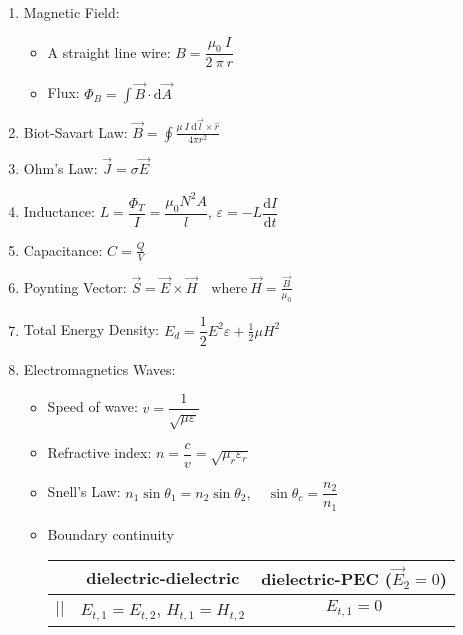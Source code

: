 \documentclass[a4paper, 11pt]{article}
\begin{document}
\begin{enumerate}
    \item Magnetic Field:
    \begin{itemize}
        \item A straight line wire: $B = \dfrac{\mu_{0} \ I}{2 \ \pi \ r}$
        \item Flux: $\Phi_{B} = \int\vec{B} \cdot \mathrm{d}\vec{A}$
    \end{itemize}

    \item Biot-Savart Law: $\displaystyle \vec{B} = \oint\frac{\mu \ I \ \mathrm{d}\vec{l}\times \hat{r}}{4 \pi r^{2}}$

    \item Ohm's Law: $\vec{J} = \sigma \vec{E}$

    \item Inductance: $L = \dfrac{\Phi_{T}}{I} = \dfrac{\mu_{0}N^{2}A}{l}$, \quad \quad $\varepsilon = -L\dfrac{\mathrm{d}I}{\mathrm{d}t}$

    \item Capacitance: $\displaystyle C = \frac{Q}{V}$

    \item Poynting Vector: $\displaystyle \vec{S} = \vec{E}\times \vec{H}\quad \text{where} \ \vec{H}=\frac{\vec{B}}{\mu_{0}}$

    \item Total Energy Density: $E_{d}=\dfrac{1}{2}E^{2}\varepsilon+\frac{1}{2}\mu H^{2}$
    
    \item Electromagnetics Waves:
    \begin{itemize}[leftmargin=*]
	\item Speed of wave: $v=\dfrac{1}{\sqrt{\mu\varepsilon}}$
        
	\item Refractive index: $ n=\dfrac{c} {v}=\sqrt{\mu_{r}\varepsilon_{r}}$

	\item Snell's Law: $n_{1} \sin \theta_{1} = n_{2} \sin \theta_{2}, \quad \sin\theta_{c} = \dfrac{n_{2}}{n_{1}}$

        \item Boundary continuity 
        \begin{table}[H] 
            \centering
		\begin{tabular}{ccc}
		\toprule
            & dielectric-dielectric & dielectric-PEC ($\vec{E}_{2}=0$)\\[.2em]
            \midrule
            $||$ & $E_{t,1}=E_{t,2}$,  $H_{t,1}=H_{t,2}$ & $E_{t,1}=0$ \\[.4em]
            

\end{tabular}
\end{table}
\end{itemize}
\end{enumerate}
\end{document}
